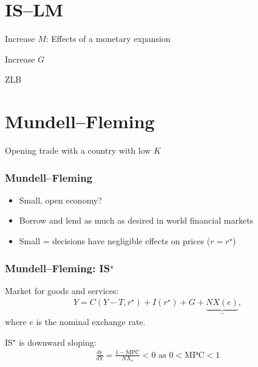 \documentclass[presentation,dvipsnames]{beamer}
\begin{document}
\section{IS--LM}
\label{sec-5}
\begin{frame}[label=sec-5-1]{Increase $M$: Effects of a monetary expansion}

\end{frame}
\begin{frame}[label=sec-5-2]{Increase $G$}
\end{frame}
\begin{frame}[label=sec-5-3]{ZLB}
\end{frame}
\section{Mundell--Fleming}
\label{sec-6}

\begin{frame}[label=sec-6-1]{Opening trade with a country with low $K$}
\end{frame}

\begin{frame}
\frametitle{Mundell--Fleming}
\begin{itemize}[label={--}]
\item Small, open economy?
\item Borrow and lend as much as desired in world financial markets
\item Small = decisions have negligible effects on prices ($r = r^{\star}$)
\end{itemize}
\end{frame}

\begin{frame}
\frametitle{Mundell--Fleming: IS$^{\star}$}
Market for goods and services:
\begin{align*}
Y = C(Y-T, r^{\star})  + I(r^{\star}) + G + \underbrace{NX(e)}_{-} ,
\end{align*}
where $e$ is the nominal exchange rate.

\vspace{1em}

IS$^{\star}$ is downward sloping:
\begin{align*}
\frac{de}{dY} = \frac{1-\text{MPC}}{NX_{e}} < 0 \text{ as } 0 < \text{MPC} < 1
\end{align*}
\end{frame}

\end{document}
